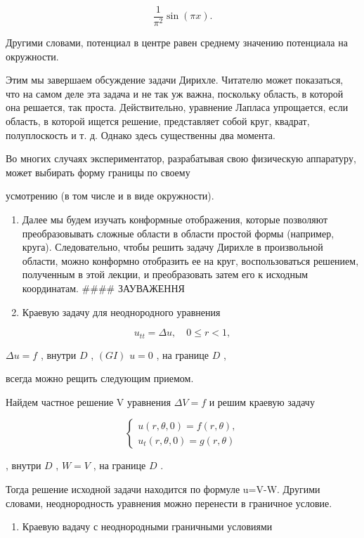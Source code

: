 \documentclass[
  ukrainian,
]{article}
\providecommand{\tightlist}{%
  \setlength{\itemsep}{0pt}\setlength{\parskip}{0pt}}
\begin{document}
\[
\frac{1}{\pi^2}\sin{(\pi x)}.
\]

Другими словами, потенциал в центре равен среднему значению потенциала
на окружности.

Этим мы завершаем обсуждение задачи Дирихле. Читателю может показаться,
что на самом деле эта задача и не так уж важна, поскольку область, в
которой она решается, так проста. Действительно, уравнение Лапласа
упрощается, если область, в которой ищется решение, представляет собой
круг, квадрат, полуплоскость и т. д. Однако здесь существенны два
момента.

Во многих случаях экспериментатор, разрабатывая свою физическую
аппаратуру, может выбирать форму границы по своему

усмотрению (в том числе и в виде окружности).

\begin{enumerate}
\def\labelenumi{\arabic{enumi}.}
\setcounter{enumi}{1}
\tightlist
\item
  Далее мы будем изучать конформные отображения, которые позволяют
  преобразовывать сложные области в области простой формы (например,
  круга). Следовательно, чтобы решить задачу Дирихле в произвольной
  области, можно конформно отобразить ее на круг, воспользоваться
  решением, полученным в этой лекции, и преобразовать затем его к
  исходным координатам. \#\#\#\# ЗАУВАЖЕННЯ
\item
  Краевую задачу для неоднородного уравнения
\end{enumerate}

\[
u_{tt} = \Delta u, \quad 0 \le r < 1,
\]

\(\Delta u = f\) , внутри \(D\) , \((GI)\) \(u = 0\) , на границе \(D\)
,

всегда можно рещить следующим приемом.

Найдем частное решение V уравнения \(\Delta V = f\) и решим краевую
задачу

\[
\begin{cases} u(r, \theta, 0) = f(r, \theta), \\ u_t(r, \theta, 0) = g(r, \theta) \end{cases}
\]

, внутри \(D\) , \(W = V\) , на границе \(D\) .

Тогда решение исходной задачи находится по формуле u=V-W. Другими
словами, неоднородность уравнения можно перенести в граничное условие.

\begin{enumerate}
\def\labelenumi{\arabic{enumi}.}
\setcounter{enumi}{1}
\tightlist
\item
  Краевую вадачу с неоднородными граничными условиями
\end{enumerate}
\end{document}
